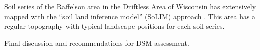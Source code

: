 \documentclass[soil, manuscript]{copernicus}
\begin{document}
Soil series of the Raffelson  area in the Driftless Area of Wisconsin has extensively mapped with the ``soil land inference model'' (SoLIM) approach \citep{Zhu.etal2001,zhuPredictionSoilProperties2010}.
%
This area has a regular topography with typical landscape positions for each soil series.




\conclusions[Discussion]  %
%
Final discussion and recommendations for DSM assessment.














\end{document}
